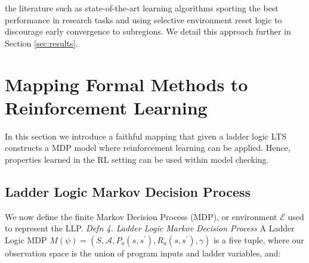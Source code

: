 \documentclass[conference,compsoc]{IEEEtran}
\begin{document}
the literature such as state-of-the-art learning algorithms sporting the best performance in research tasks and using selective environment reset logic to discourage early convergence to subregions. We detail this approach further in Section \ref{sec:results}.


\section{Mapping Formal Methods to Reinforcement Learning} \label{sec:mapping_fm_to_ml}
In this section we introduce a faithful mapping that given a ladder logic LTS constructs a MDP model where reinforcement learning can be applied. Hence, properties learned in the RL setting can be used within model checking.


\subsection{Ladder Logic Markov Decision Process}\label{subsect:MDP}
We now define the finite Markov Decision Process (MDP), or environment $\mathcal{E}$ used to represent the LLP. 
\textit{Defn 4. Ladder Logic Markov Decision Process}
A Ladder Logic MDP $M(\psi) = (S,\mathcal{A},P_a(s,s^\prime), R_a(s,s^\prime),\gamma)$ is a five tuple, where our observation space is the union of program inputs and ladder variables, and:
\end{document}
